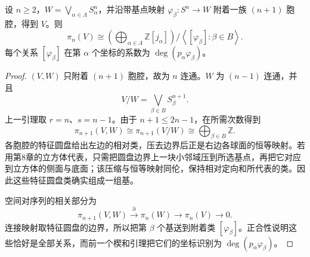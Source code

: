 \begin{lemma}\label{g2:lem:cell-attachment-homotopy-presentation}
	设 \(n\ge2\)，\(W=\bigvee_{\alpha\in\Lambda}S^n_\alpha\)，并沿带基点映射 \(\varphi_\beta:S^n\to W\) 附着一族 \((n+1)\) 胞腔，得到 \(V\)。则
	\[
		\pi_n(V)\cong
		\left(\bigoplus_{\alpha\in\Lambda}\mathbb Z[j_\alpha]\right)
		\Big/\left\langle[\varphi_\beta]:\beta\in B\right\rangle.
	\]
	每个关系 \([\varphi_\beta]\) 在第 \(\alpha\) 个坐标的系数为 \(\deg(p_\alpha\varphi_\beta)\)。
\end{lemma}
\begin{proof}
	\((V,W)\) 只附着 \((n+1)\) 胞腔，故为 \(n\) 连通。\(W\) 为 \((n-1)\) 连通，并且
	\[
		V/W=\bigvee_{\beta\in B}S^{n+1}_\beta.
	\]
	上一引理取 \(r=n\)、\(s=n-1\)。由于 \(n+1\le2n-1\)，在所需次数得到
	\[
		\pi_{n+1}(V,W)\cong\pi_{n+1}(V/W)\cong\bigoplus_{\beta\in B}\mathbb Z.
	\]
	各胞腔的特征圆盘给出左边的相对类，压去边界后正是右边各球面的恒等映射。若用第8章的立方体代表，只需把圆盘边界上一块小邻域压到所选基点，再把它对应到立方体的侧面与底面；该压缩与恒等映射同伦，保持相对定向和所代表的类。因此这些特征圆盘类确实组成一组基。

	空间对序列的相关部分为
	\[
		\pi_{n+1}(V,W)\xrightarrow{\partial}\pi_n(W)\longrightarrow\pi_n(V)\longrightarrow0.
	\]
	连接映射取特征圆盘的边界，所以把第 \(\beta\) 个基送到附着类 \([\varphi_\beta]\)。正合性说明这些恰好是全部关系，而前一个楔和引理把它们的坐标识别为 \(\deg(p_\alpha\varphi_\beta)\)。
\end{proof}

